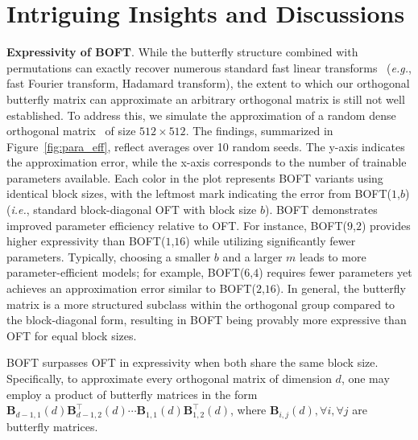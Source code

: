 \section{Intriguing Insights and Discussions}

\textbf{Expressivity of BOFT}. While the butterfly structure combined with permutations can exactly recover numerous standard fast linear transforms~\cite{dao2019learning,dao2019kaleidoscope} (\emph{e.g.}, fast Fourier transform, Hadamard transform), the extent to which our orthogonal butterfly matrix can approximate an arbitrary orthogonal matrix is still not well established. To address this, we simulate the approximation of a random dense orthogonal matrix~\cite{anderson1987generation} of size $512\times 512$. The findings, summarized in Figure~\ref{fig:para_eff}, reflect averages over 10 random seeds. The y-axis indicates the approximation error, while the x-axis corresponds to the number of trainable parameters available. Each color in the plot represents BOFT variants using identical block sizes, with the leftmost mark indicating the error from BOFT($1$,$b$) (\emph{i.e.}, standard block-diagonal OFT with block size $b$). BOFT demonstrates improved parameter efficiency relative to OFT. For instance, BOFT($9$,$2$) provides higher expressivity than BOFT($1$,$16$) while utilizing significantly fewer parameters. Typically, choosing a smaller $b$ and a larger $m$ leads to more parameter-efficient models; for example, BOFT($6$,$4$) requires fewer parameters yet achieves an approximation error similar to BOFT($2$,$16$). In general, the butterfly matrix is a more structured subclass within the orthogonal group compared to the block-diagonal form, resulting in BOFT being provably more expressive than OFT for equal block sizes.

\begin{theorem}\label{thm:exp_boft}
    BOFT surpasses OFT in expressivity when both share the same block size. Specifically, to approximate every orthogonal matrix of dimension $d$, one may employ a product of butterfly matrices in the form $\bm{B}_{d-1,1}(d)\bm{B}^\top_{d-1,2}(d)\cdots\bm{B}_{1,1}(d)\bm{B}^\top_{1,2}(d)$, where $\bm{B}_{i,j}(d),\forall i,\forall j$ are butterfly matrices.
\end{theorem}

